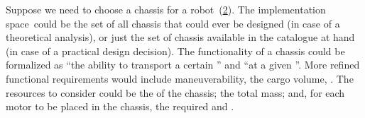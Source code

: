 \begin{figure}[h]
	\centering
	\caption{}
	\label{fig:motor_evalexec}
\end{figure}

\begin{example}
	\label{exa:chassis}
	Suppose we need to choose a chassis for a robot~(\cref{fig:gmcdp_chassis_eval}).
	The implementation space~\impsp could be the set of all chassis that could ever be designed (in case of a theoretical analysis), or just the set of chassis available in the catalogue at hand (in case of a practical design decision).
	The functionality of a chassis could be formalized as ``the ability to transport a certain '' and ``at a given ''.
	More refined functional requirements would include maneuverability, the cargo volume, \etc.
	The resources to consider could be the  of the chassis; the total mass;
	and, for each motor to be placed in the chassis, the required  and .
\end{example}

\begin{figure}[h]
	\centering
	\caption{}
	\label{fig:gmcdp_chassis_eval}
\end{figure}


